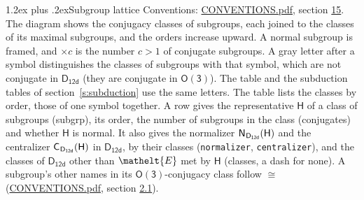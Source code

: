 \documentclass[10pt,a4paper]{article}
\makeatletter
\renewcommand\section{\@startsection{section}{1}{\z@}{-3ex plus -1ex minus -.2ex}%
  {1.2ex plus .2ex}{\normalfont\large\sffamily\bfseries\color{parttitle}}}
\numberwithin{equation}{section}
\newcommand{\eltfont}[1]{{\let\sigma\eltsigma\mathelt{#1}}}
\newcommand{\grp}[1]{\mathsf{#1}}
\newcommand{\cls}[1]{\eltfont{#1}}
\newcommand{\samecls}{\cong}
\newcommand{\hairsp}{\mkern1mu}
\makeatother
\begin{document}
\section{Subgroup lattice}\label{s:subgroups}
Conventions: \href{../../CONVENTIONS.pdf}{CONVENTIONS.pdf}, section \href{../../CONVENTIONS.pdf\#conv.15}{15}.
The diagram shows the conjugacy classes of subgroups, each joined to the classes of its maximal subgroups, and the orders increase upward. A normal subgroup is framed, and ${\times}c$ is the number $c > 1$ of conjugate subgroups. A gray letter after a symbol distinguishes the classes of subgroups with that symbol, which are not conjugate in $\grp{D_{12d}}$ (they are conjugate in \href{O3.pdf}{$\grp{O(3)}$}). The table and the subduction tables of section~\ref{s:subduction} use the same letters. The table lists the classes by order, those of one symbol together. \label{n:group.H}\label{n:head.subgroup}\label{n:head.order}\label{n:head.conjugates}\label{n:head.normal}A row gives the representative $\grp{H}$ of a class of subgroups (subgrp), its order, the number of subgroups in the class (conjugates) and whether $\grp{H}$ is normal. \label{n:group.normalizer}\label{n:group.centralizer}\label{n:head.classes}It also gives the normalizer $\grp{N}_{\hairsp \grp{D_{12d}}}(\grp{H})$ and the centralizer $\grp{C}_{\hairsp \grp{D_{12d}}}(\grp{H})$ in $\grp{D_{12d}}$, by their classes (\texttt{normalizer}, \texttt{centralizer}), and the classes of $\grp{D_{12d}}$ other than $\cls{E}$ met by $\grp{H}$ (classes, a dash for none). A subgroup's other names in its \href{O3.pdf}{$\grp{O(3)}$}-conjugacy class follow $\samecls$ (\href{../../CONVENTIONS.pdf}{CONVENTIONS.pdf}, section \href{../../CONVENTIONS.pdf\#conv.2.1}{2.1}).
\end{document}
